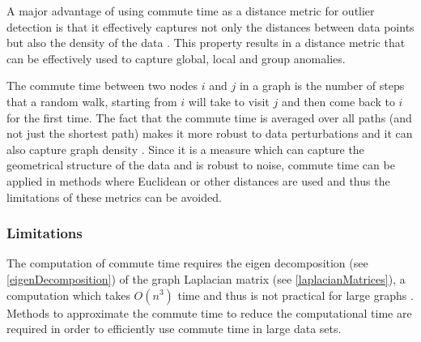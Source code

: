 A major advantage of using commute time as a distance metric for outlier
detection is that it effectively captures not only the distances between data
points but also the density of the data \citeNeeded{}. This property results in
a distance metric that can be effectively used to capture global, local and
group anomalies.

The commute time between two nodes $i$ and $j$ in a graph is the number of steps
that a random walk, starting from $i$ will take to visit $j$ and then come back
to $i$ for the first time. The fact that the commute time is averaged over all
paths (and not just the shortest path) makes it more robust to data
perturbations and it can also capture graph density \cite{Khoa:2012}. Since it
is a measure which can capture the geometrical structure of the data and is
robust to noise, commute time can be applied in methods where Euclidean or other
distances are used and thus the limitations of these metrics can be avoided.

\subsubsection{Limitations}
\label{commuteTime:limitations}
The computation of commute time requires the eigen decomposition (see
\autoref{eigenDecomposition}) of the graph Laplacian matrix (see
\autoref{laplacianMatrices}), a computation which takes $O(n^3)$ time and thus
is not practical for large graphs \citeNeeded{}. Methods to approximate the
commute time to reduce the computational time are required in order to
efficiently use commute time in large data sets.
